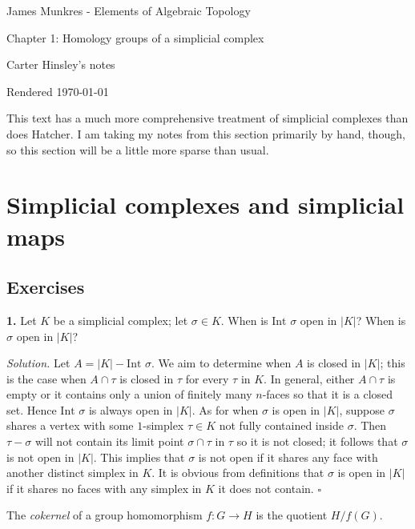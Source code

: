 \documentclass[a4paper]{article}
\begin{document}
\begin{center}
\LARGE{James Munkres - Elements of Algebraic Topology}

\Large{Chapter 1: Homology groups of a simplicial complex}

\large{Carter Hinsley's notes}

Rendered \today
\end{center}

This text has a much more comprehensive treatment of simplicial complexes than does Hatcher. I am taking my notes from this section primarily by hand, though, so this section will be a little more sparse than usual.

\section{Simplicial complexes and simplicial maps}

\subsection{Exercises}

\textbf{1.} Let $K$ be a simplicial complex; let $\sigma \in K$. When is $\text{Int } \sigma$ open in $|K|$? When is $\sigma$ open in $|K|$?

\emph{Solution.} Let $A = |K| - \text{Int } \sigma$. We aim to determine when $A$ is closed in $|K|$; this is the case when $A \cap \tau$ is closed in $\tau$ for every $\tau$ in $K$. In general, either $A \cap \tau$ is empty or it contains only a union of finitely many $n$-faces so that it is a closed set. Hence $\text{Int } \sigma$ is always open in $|K|$. As for when $\sigma$ is open in $|K|$, suppose $\sigma$ shares a vertex with some $1$-simplex $\tau \in K$ not fully contained inside $\sigma$. Then $\tau - \sigma$ will not contain its limit point $\sigma \cap \tau$ in $\tau$ so it is not closed; it follows that $\sigma$ is not open in $|K|$. This implies that $\sigma$ is not open if it shares any face with another distinct simplex in $K$. It is obvious from definitions that $\sigma$ is open in $|K|$ if it shares no faces with any simplex in $K$ it does not contain. $\square$

The \emph{cokernel} of a group homomorphism $f : G \to H$ is the quotient $H/f(G)$.
\end{document}

